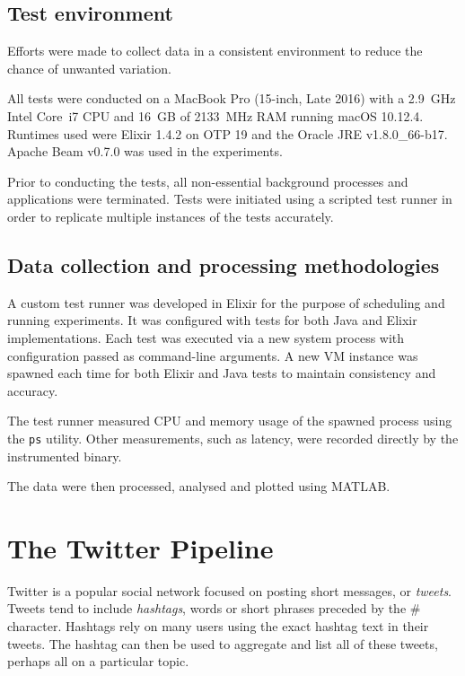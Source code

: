 \subsection{Test environment}\label{sec:eval:approach:environment}

Efforts were made to collect data in a consistent environment to reduce the chance of unwanted variation.

All tests were conducted on a MacBook Pro (15-inch, Late 2016) with a \SI{2.9}{\giga\hertz} Intel Core~i7 CPU and \SI{16}{GB} of \SI{2133}{\mega\hertz} RAM running macOS 10.12.4.
Runtimes used were Elixir 1.4.2 on OTP 19 and the Oracle JRE v1.8.0\_66-b17.
Apache Beam v0.7.0 was used in the experiments.

Prior to conducting the tests, all non-essential background processes and applications were terminated.
Tests were initiated using a scripted test runner in order to replicate multiple instances of the tests accurately.

\subsection{Data collection and processing methodologies}\label{sec:eval:approach:collection}

A custom test runner was developed in Elixir for the purpose of scheduling and running experiments.
It was configured with tests for both Java and Elixir implementations.
Each test was executed via a new system process with configuration passed as command-line arguments.
A new VM instance was spawned each time for both Elixir and Java tests to maintain consistency and accuracy.

The test runner measured CPU and memory usage of the spawned process using the \verb|ps| utility.
Other measurements, such as latency, were recorded directly by the instrumented binary.

The data were then processed, analysed and plotted using MATLAB.

\section{The Twitter Pipeline}\label{sec:eval:approach:twitter}

Twitter is a popular social network focused on posting short messages, or \emph{tweets}.
Tweets tend to include \emph{hashtags}, words or short phrases preceded by the \# character.
Hashtags rely on many users using the exact hashtag text in their tweets.
The hashtag can then be used to aggregate and list all of these tweets, perhaps all on a particular topic.

